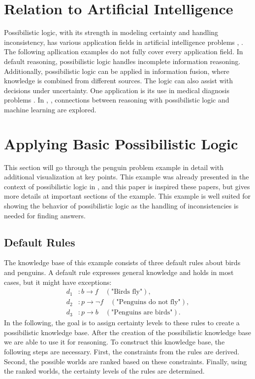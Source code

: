 \documentclass[seminar,english,m]{AIGpaper}
\begin{document}
\section{Relation to Artificial Intelligence} \label{RelationAI}
Possibilistic logic, with its strength in modeling certainty and handling inconsistency, has various application fields in artificial intelligence problems \cite{dubois2014possibilistic}, \cite{2021possibility}. The following apllication examples do not fully cover every application field. In default reasoning, possibilistic logic handles incomplete information reasoning. Additionally, possibilistic logic can be applied in information fusion, where knowledge is combined from different sources. The logic can also assist with decisions under uncertainty. One application is its use in medical diagnosis problems \cite{grabisch2003}. In \cite{dubois2020possibilistic}, \cite{persia2023learning}, connections between reasoning with possibilistic logic and machine learning are explored.
\section{Applying Basic Possibilistic Logic} \label{Examples}  
This section will go through the penguin problem example in detail with additional visualization at key points. This example was already presented in the context of possibilistic logic in \cite{dubois2014possibilistic}, \cite{prade1992representing} and this paper is inspired these papers, but gives more details at important sections of the example. This example is well suited for showing the behavior of possibilistic logic as the handling of inconsistencies is needed for finding answers.
\subsection{Default Rules}  
The knowledge base of this example consists of three default rules about birds and penguins. A default rule expresses general knowledge and holds in most cases, but it might have exceptions:  
\begin{align*}
	d_1 &: b \rightarrow f \quad (\text{"Birds fly"}), \\
	d_2 &: p \rightarrow \neg f \quad (\text{"Penguins do not fly"}), \\
	d_3 &: p \rightarrow b \quad (\text{"Penguins are birds"}).
\end{align*}  
In the following, the goal is to assign certainty levels to these rules to create a possibilistic knowledge base. After the creation of the possibilistic knowledge base we are able to use it for reasoning. To construct this knowledge base, the following steps are necessary. First, the constraints from the rules are derived. Second, the possible worlds are ranked based on these constraints. Finally, using the ranked worlds, the certainty levels of the rules are determined.
\end{document}
